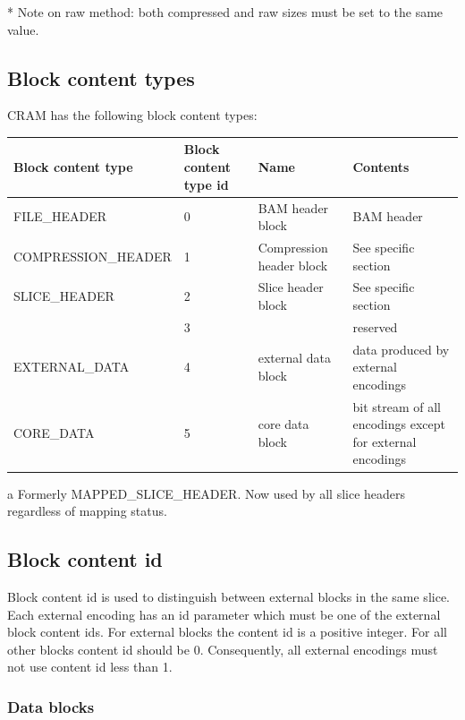 \documentclass[a4paper]{article}
\begin{document}
* Note on raw method: both compressed and raw sizes must be set to the same value.

\subsection{\textbf{Block content types}}

CRAM has the following block content types:

\begin{threeparttable}[t]
\begin{tabular}{|>{\raggedright}p{143pt}|>{\raggedright}p{45pt}|>{\raggedright}p{116pt}|>{\raggedright}p{114pt}|}
\hline
\textbf{Block content type} & \textbf{Block content type id} & \textbf{Name} & \textbf{Contents}\tabularnewline
\hline
FILE\_HEADER & 0 & BAM header block & BAM header\tabularnewline
\hline
COMPRESSION\_HEADER & 1 & Compression header block & See specific section\tabularnewline
\hline
SLICE\_HEADER\tnote{a} & 2 & Slice header block & See specific section\tabularnewline
\hline
 & 3 &  & reserved\tabularnewline
\hline
EXTERNAL\_DATA & 4 & external data block & data produced by external encodings\tabularnewline
\hline
CORE\_DATA & 5 & core data block & bit stream of all encodings except for external encodings\tabularnewline
\hline
\end{tabular}
\begin{tablenotes}
\item[a] Formerly MAPPED\_SLICE\_HEADER.  Now used by all slice headers regardless of mapping status.
\end{tablenotes}
\end{threeparttable}

\subsection{\textbf{Block content id}}

Block content id is used to distinguish between external blocks in the same slice. 
Each external encoding has an id parameter which must be one of the external block 
content ids. For external blocks the content id is a positive integer. For all 
other blocks content id should be 0. Consequently, all external encodings must 
not use content id less than 1. 

\subsubsection*{Data blocks}
\end{document}

